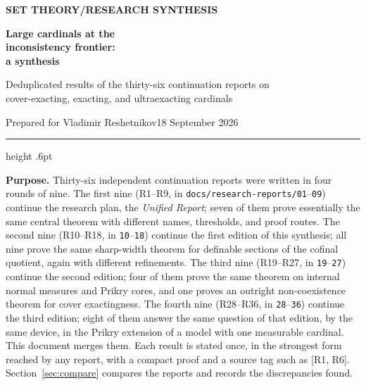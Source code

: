 \documentclass[11pt,letterpaper]{article}
\theoremstyle{definition}
\numberwithin{equation}{section}
\newcommand{\R}[1]{\textsf{R#1}}
\begin{document}
\thispagestyle{empty}
{\sffamily\bfseries\small\color{Olive}SET THEORY\quad /\quad RESEARCH SYNTHESIS}

\vspace{13pt}
{\fontsize{28}{31}\selectfont\bfseries\color{Forest}Large cardinals at the\\ inconsistency frontier:\\ a synthesis\par}
\vspace{10pt}
{\fontsize{14}{18}\selectfont Deduplicated results of the thirty-six continuation reports on\\ cover-exacting, exacting, and ultraexacting cardinals\par}
\vspace{14pt}
{\color{Muted}Prepared for Vladimir Reshetnikov\hfill 18 September 2026\par}
\vspace{3pt}
{\color{Sage}\hrule height .6pt}
\vspace{12pt}

\textbf{Purpose.} Thirty-six independent continuation reports were written in four rounds of nine. The first nine (\R1--\R9, in \nolinkurl{docs/research-reports/01}--\nolinkurl{09}) continue the research plan, the \emph{Unified Report}; seven of them prove essentially the same central theorem with different names, thresholds, and proof routes. The second nine (\R{10}--\R{18}, in \nolinkurl{10}--\nolinkurl{18}) continue the first edition of this synthesis; all nine prove the same sharp-width theorem for definable sections of the cofinal quotient, again with different refinements. The third nine (\R{19}--\R{27}, in \nolinkurl{19}--\nolinkurl{27}) continue the second edition; four of them prove the same theorem on internal normal measures and Prikry cores, and one proves an outright non-coexistence theorem for cover exactingness. The fourth nine (\R{28}--\R{36}, in \nolinkurl{28}--\nolinkurl{36}) continue the third edition; eight of them answer the same question of that edition, by the same device, in the Prikry extension of a model with one measurable cardinal. This document merges them. Each result is stated once, in the strongest form reached by any report, with a compact proof and a source tag such as {\small\sffamily\color{Olive}[R1, R6]}. Section~\ref{sec:compare} compares the reports and records the discrepancies found.
\end{document}
